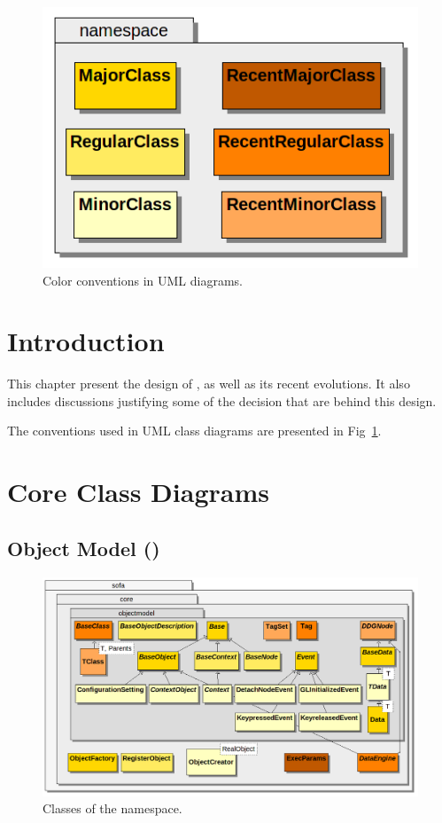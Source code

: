 \begin{figure}%
\centering%
\vspace{-1cm}
\includegraphics[scale=.33]{../classdiagrams/uml-legend.png}%
\caption{Color conventions in UML diagrams.}%
\label{fig:uml-legend}%
\end{figure}%

\section{Introduction}

This chapter present the design of \sofa{}, as well as its recent evolutions.
It also includes discussions justifying some of the decision that are behind this design.

The conventions used in UML class diagrams are presented in Fig~\ref{fig:uml-legend}.

\vspace{.8cm}

\section{Core Class Diagrams}

\subsection{Object Model ()}

\begin{figure}[h]
\centering
\includegraphics[scale=.33]{../classdiagrams/sofacore-objectmodel.png}
\caption{Classes of the  namespace.}
\label{fig:uml-sofa-core-objectmodel}
\end{figure}

